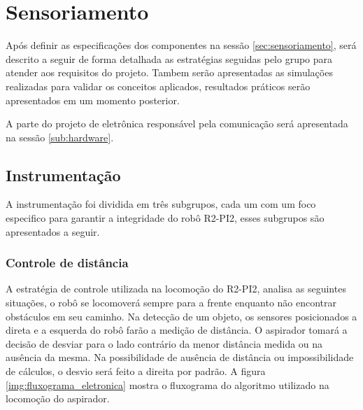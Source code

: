 \section{Sensoriamento} %
\label{sec:sensoriamento2}

	Após definir as especificações dos componentes na sessão \ref{sec:sensoriamento}, será descrito a seguir de forma detalhada as estratégias seguidas pelo grupo para atender aos requisitos do projeto. Tambem serão apresentadas as simulações realizadas para validar os conceitos aplicados, resultados práticos serão apresentados em um momento posterior.

	A parte do projeto de eletrônica responsável pela comunicação será apresentada na sessão \ref{sub:hardware}.

	\subsection{Instrumentação} %
	\label{sub:instrumentação2}
		A instrumentação foi dividida em três subgrupos, cada um com um foco especifico para garantir a integridade do robô R2-PI2, esses subgrupos são apresentados a seguir.

		\subsubsection{Controle de distância}
		\label{sub:Controle_de_distância}
		A estratégia de controle utilizada na locomoção do R2-PI2, analisa as seguintes situações, o robô se locomoverá sempre para a frente enquanto não encontrar obstáculos em seu caminho. Na detecção de um objeto, os sensores posicionados a direta e a esquerda do robô farão a medição de distância. O aspirador tomará a decisão de desviar para o lado contrário da menor distância medida ou na ausência da mesma. Na possibilidade de ausência de distância ou impossibilidade de cálculos, o desvio será feito a direita por padrão. A figura \ref{img:fluxograma_eletronica} mostra o fluxograma do algoritmo utilizado na locomoção do aspirador.


